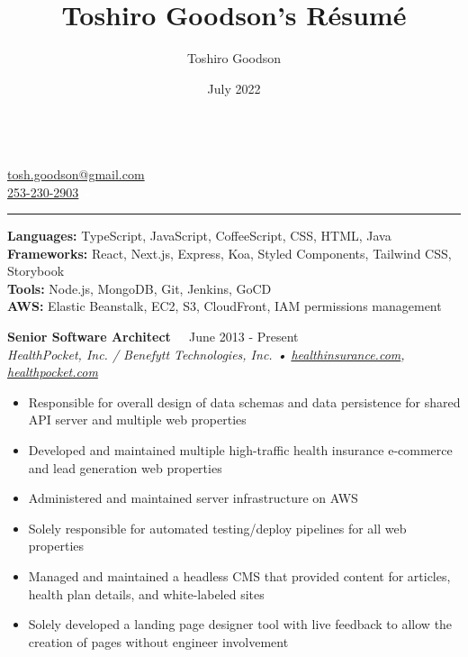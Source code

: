 \documentclass{resume}
\title{Toshiro Goodson's Résumé}
\author{Toshiro Goodson}
\date{July 2022}
\begin{document}
\color{content}
{\Large{}}\\
\href{mailto:tosh.goodson@gmail.com}{\color{content}tosh.goodson@gmail.com}\\
\href{tel:+12532302903}{\color{content}253-230-2903}
\hfill{\textcolor{white}{•}} %
\hfill{
	\href{https://github.com/toshgoodson}{}
	\hspace{2pt}
	\href{https://www.linkedin.com/in/toshgoodson/}{}
}

\nointerlineskip
\rule{\textwidth}{1pt}

\nointerlineskip
\colorbox{headerbg1}{\hspace{\linewidth}\hspace{-2\fboxsep}}

\textbf{Languages:} TypeScript, JavaScript, CoffeeScript, CSS, HTML, Java\\
\textbf{Frameworks:} React, Next.js, Express, Koa, Styled Components, Tailwind CSS, Storybook\\
\textbf{Tools:} Node.js, MongoDB, Git, Jenkins, GoCD\\
\textbf{AWS:} Elastic Beanstalk, EC2, S3, CloudFront, IAM permissions management

\bigskip

\colorbox{headerbg2}{\hspace{\linewidth}\hspace{-2\fboxsep}}

\textbf{Senior Software Architect}
\hfill{\textcolor{white}{•} June 2013 - Present}\\
\textit{HealthPocket, Inc. / Benefytt Technologies, Inc. • \href{https://www.healthinsurance.com}{healthinsurance.com}, \href{https://www.healthpocket.com}{healthpocket.com}}

\nointerlineskip
\begin{itemize}
	\item Responsible for overall design of data schemas and data persistence for shared API server and multiple web properties
	\item Developed and maintained multiple high-traffic health insurance e-commerce and lead generation web properties
	\item Administered and maintained server infrastructure on AWS
	\item Solely responsible for automated testing/deploy pipelines for all web properties
	\item Managed and maintained a headless CMS that provided content for articles, health plan details, and white-labeled sites
	\item Solely developed a landing page designer tool with live feedback to allow the creation of pages without engineer involvement
\end{itemize}
\end{document}
